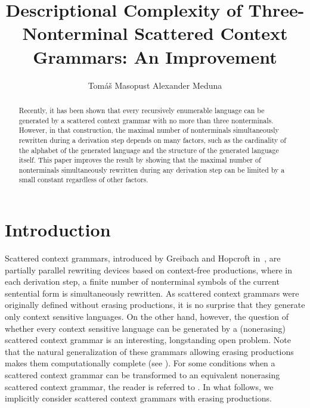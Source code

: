 \documentclass[copyright]{eptcs}
\begin{document}
\title{Descriptional Complexity of Three-Nonterminal Scattered Context Grammars: An Improvement}
\def\titlerunning{Three-Nonterminal Scattered Context Grammars: An Improvement}
\author{Tom{\' a}{\v s} Masopust \qquad Alexander Meduna
}
\def\authorrunning{T.~Masopust, A.~Meduna}

\maketitle
  \begin{abstract}
    Recently, it has been shown that every recursively enumerable language can be generated by a scattered context grammar with no more than three nonterminals. However, in that construction, the maximal number of nonterminals simultaneously rewritten during a derivation step depends on many factors, such as the cardinality of the alphabet of the generated language and the structure of the generated language itself. This paper improves the result by showing that the maximal number of nonterminals simultaneously rewritten during any derivation step can be limited by a small constant regardless of other factors.
  \end{abstract}

\section{Introduction}
  Scattered context grammars, introduced by Greibach and Hopcroft in~\cite{GreHop}, are partially parallel rewriting devices based on context-free productions, where in each derivation step, a finite number of nonterminal symbols of the current sentential form is simultaneously rewritten. As scattered context grammars were originally defined without erasing productions, it is no surprise that they generate only context sensitive languages. On the other hand, however, the question of whether every context sensitive language can be generated by a (nonerasing) scattered context grammar is an interesting, longstanding open problem. Note that the natural generalization of these grammars allowing erasing productions makes them computationally complete (see \cite{meduna:eatcs}). For some conditions when a scattered context grammar can be transformed to an equivalent nonerasing scattered context grammar, the reader is referred to \cite{techetAI}. In what follows, we implicitly consider scattered context grammars with erasing productions.
\end{document}

